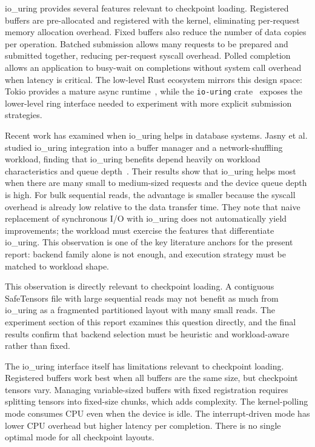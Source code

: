 io\_uring provides several features relevant to checkpoint loading. Registered buffers are pre-allocated and registered with the kernel, eliminating per-request memory allocation overhead. Fixed buffers also reduce the number of data copies per operation. Batched submission allows many requests to be prepared and submitted together, reducing per-request syscall overhead. Polled completion allows an application to busy-wait on completions without system call overhead when latency is critical. The low-level Rust ecosystem mirrors this design space: Tokio provides a mature async runtime~\cite{tokio_docs,tokio_repo}, while the \texttt{io-uring} crate~\cite{io_uring_crate} exposes the lower-level ring interface needed to experiment with more explicit submission strategies.

Recent work has examined when io\_uring helps in database systems. Jasny et al. studied io\_uring integration into a buffer manager and a network-shuffling workload, finding that io\_uring benefits depend heavily on workload characteristics and queue depth~\cite{IOURING_DATABASE_GUIDELINES}. Their results show that io\_uring helps most when there are many small to medium-sized requests and the device queue depth is high. For bulk sequential reads, the advantage is smaller because the syscall overhead is already low relative to the data transfer time. They note that naive replacement of synchronous I/O with io\_uring does not automatically yield improvements; the workload must exercise the features that differentiate io\_uring. This observation is one of the key literature anchors for the present report: backend family alone is not enough, and execution strategy must be matched to workload shape.

This observation is directly relevant to checkpoint loading. A contiguous SafeTensors file with large sequential reads may not benefit as much from io\_uring as a fragmented partitioned layout with many small reads. The experiment section of this report examines this question directly, and the final results confirm that backend selection must be heuristic and workload-aware rather than fixed.

The io\_uring interface itself has limitations relevant to checkpoint loading. Registered buffers work best when all buffers are the same size, but checkpoint tensors vary. Managing variable-sized buffers with fixed registration requires splitting tensors into fixed-size chunks, which adds complexity. The kernel-polling mode consumes CPU even when the device is idle. The interrupt-driven mode has lower CPU overhead but higher latency per completion. There is no single optimal mode for all checkpoint layouts.

